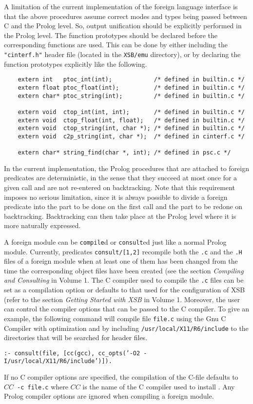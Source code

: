 A limitation of the current implementation of the foreign language
interface is that the above procedures assume correct modes and types
being passed between C and the Prolog level.  So, output unification
should be explicitly performed in the Prolog level.  The function
prototypes should be declared before the corresponding functions are
used.  This can be done by either including the {\tt "cinterf.h"} header
file (located in the {\tt XSB/emu} directory), or by declaring the
function prototypes explicitly like the following.
\begin{verbatim}
    extern int   ptoc_int(int);            /* defined in builtin.c */
    extern float ptoc_float(int);          /* defined in builtin.c */
    extern char* ptoc_string(int);         /* defined in builtin.c */
 
    extern void  ctop_int(int, int);       /* defined in builtin.c */
    extern void  ctop_float(int, float);   /* defined in builtin.c */
    extern void  ctop_string(int, char *); /* defined in builtin.c */
    extern void  c2p_string(int, char *);  /* defined in cinterf.c */

    extern char* string_find(char *, int); /* defined in psc.c */
\end{verbatim}

In the current implementation, the Prolog procedures that are
attached to foreign predicates are deterministic, in the sense that
they succeed at most once for a given call and are not re-entered on
backtracking.  Note that this requirement imposes no serious
limitation, since it is always possible to divide a foreign predicate
into the part to be done on the first call and the part to be redone
on backtracking.  Backtracking can then take place at the Prolog
level where it is more naturally expressed.

A foreign module can be {\tt compile}d or {\tt consult}ed just like a
normal Prolog module.  Currently, predicates {\tt consult/[1,2]}
recompile both the {\tt *.c} and the {\tt *.H} files of a foreign
module when at least one of them has been changed from the time the
corresponding object files have been created (see the section {\it
Compiling and Consulting} in Volume 1. 
The C compiler used to compile the {\tt *.c} files can be set as a
compilation option or defaults to that used for the configuration of
XSB (refer to the section {\it Getting Started with XSB} in Volume 1.
Moreover, the user can control the compiler options that can be passed
to the C compiler.  To give an example, the following command will
compile file {\tt file.c} using the Gnu C Compiler with optimization
and by including {\tt /usr/local/X11/R6/include} to the directories that
will be searched for header files.
\begin{center}
{\tt  :- consult(file,
		 [cc(gcc), cc\_opts('-O2 -I/usr/local/X11/R6/include')]). }
\end{center}
If no C compiler options are specified, the compilation of the C-file
defaults to $CC$~{\tt -c~file.c} where $CC$ is the name of the C compiler
used to install \ourprolog.
Any Prolog compiler options are ignored when compiling a foreign module.

